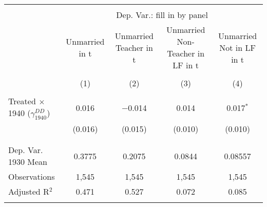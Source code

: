 
\begin{tabular}{@{\extracolsep{5pt}}lcccc} 
\\[-1.8ex]\hline 
\hline \\[-1.8ex] 
 & \multicolumn{4}{c}{Dep. Var.: fill in by panel} \\ 
\cline{2-5} 
 & Unmarried in t & Unmarried Teacher in t & Unmarried Non-Teacher in LF in t & Unmarried Not in LF in t \\ 
\\[-1.8ex] & (1) & (2) & (3) & (4)\\ 
\hline \\[-1.8ex] 
 Treated $\times$ 1940 ($\gamma_{1940}^{DD}$) & 0.016 & $-$0.014 & 0.014 & 0.017$^{*}$ \\ 
  & (0.016) & (0.015) & (0.010) & (0.010) \\ 
  & & & & \\ 
\hline \\[-1.8ex] 
Dep. Var. 1930 Mean & 0.3775 & 0.2075 & 0.0844 & 0.08557 \\ 
Observations & 1,545 & 1,545 & 1,545 & 1,545 \\ 
Adjusted R$^{2}$ & 0.471 & 0.527 & 0.072 & 0.085 \\ 
\hline 
\hline \\[-1.8ex] 
\end{tabular} 
